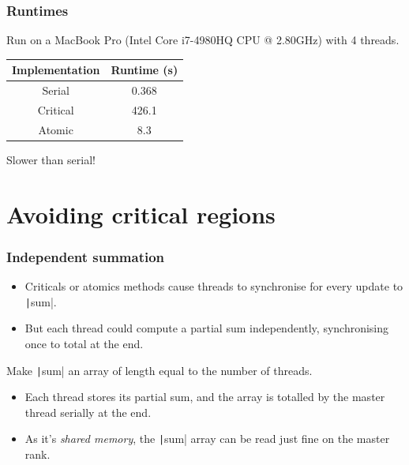 \documentclass{beamer}
\begin{document}
%
\begin{frame}
\frametitle{Runtimes}
Run on a MacBook Pro (Intel Core i7-4980HQ CPU @ 2.80GHz) with 4 threads.

\vfill

\begin{table}
\begin{tabular}{cc}
\toprule
Implementation & Runtime (s) \\
\midrule
Serial   & 0.368 \\
Critical & 426.1 \\
Atomic   & 8.3 \\
\bottomrule
\end{tabular}
\end{table}


\begin{center}
\large Slower than serial!
\end{center}

\end{frame}

\section{Avoiding critical regions}
\begin{frame}
\frametitle{Independent summation}
\begin{itemize}
  \item Criticals or atomics methods cause threads to synchronise for every update to \texttt|sum|.
  \item But each thread could compute a partial sum independently, synchronising once to total at the end.
\end{itemize}

\vfill

Make \texttt|sum| an array of length equal to the number of threads.
\begin{itemize}
  \item Each thread stores its partial sum, and the array is totalled by the master thread serially at the end.
  \item As it's \emph{shared memory}, the \texttt|sum| array can be read just fine on the master rank.
\end{itemize}
\end{frame}
\end{document}
